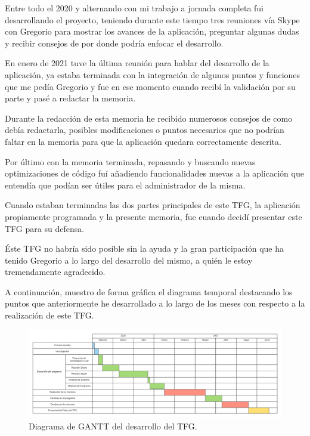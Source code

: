 \documentclass[a4paper, 12pt]{book}
\begin{document}
Entre todo el 2020 y alternando con mi trabajo a jornada completa fui desarrollando el proyecto, teniendo durante este tiempo tres reuniones vía Skype con Gregorio para mostrar los avances de la aplicación, preguntar algunas dudas y recibir consejos de por donde podría enfocar el desarrollo.

En enero de 2021 tuve la última reunión para hablar del desarrollo de la aplicación, ya estaba terminada con la integración de algunos puntos y funciones que me pedía Gregorio y fue en ese momento cuando recibí la validación por su parte y pasé a redactar la memoria.

Durante la redacción de esta memoria he recibido numerosos consejos de como debía redactarla, posibles modificaciones o puntos necesarios que no podrían faltar en la memoria para que la aplicación quedara correctamente descrita.

Por último con la memoria terminada, repasando y buscando nuevas optimizaciones de código fuí añadiendo funcionalidades nuevas a la aplicación que entendía que podían ser útiles para el administrador de la misma.

Cuando estaban terminadas las dos partes principales de este TFG, la aplicación propiamente programada y la presente memoria, fue cuando decidí presentar este TFG para su defensa.

Éste TFG no habría sido posible sin la ayuda y la gran participación que ha tenido Gregorio a lo largo del desarrollo del mismo, a quién le estoy tremendamente agradecido.

\vspace{5mm}

A continuación, muestro de forma gráfica el diagrama temporal destacando los puntos que anteriormente he desarrollado a lo largo de los meses con respecto a la realización de este TFG.

\begin{figure}[h!]
  \centering
  \includegraphics[width=16cm, keepaspectratio]{img/diagrama.png}
  \caption{Diagrama de GANTT del desarrollo del TFG.}\label{fig:diagrama}
\end{figure}
\end{document}
